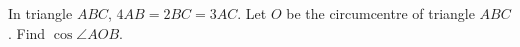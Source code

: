 In triangle $ABC$, $4AB=2BC=3AC$. Let $O$ be the circumcentre of triangle $ABC$. Find $\cos\angle AOB$.
